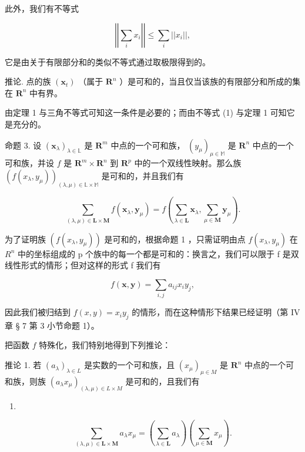 此外，我们有不等式

\[
\left| \left| \sum_ {i} x _ {i} \right| \right| \leqslant \sum_ {i} | | x _ {i} | |,\tag{2}
\]

它是由关于有限部分和的类似不等式通过取极限得到的。

推论. 点的族 \((\pmb{x}_t)\) （属于 \(\mathbf{R}^n\) ）是可和的，当且仅当该族的有限部分和所成的集在 \(\mathbf{R}^n\) 中有界。

由定理 1 与三角不等式可知这一条件是必要的；而由不等式 (1) 与定理 1 可知它是充分的。

命题 3. 设 \((\pmb{x}_{\lambda})_{\lambda \in \mathbb{L}}\) 是 \(\mathbf{R}^m\) 中点的一个可和族， \((y_{\mu})_{\mu \in \mathbb{M}}\) 是 \(\mathbf{R}^n\) 中点的一个可和族，并设 \(f\) 是 \(\mathbf{R}^m \times \mathbf{R}^n\) 到 \(\mathbf{R}^p\) 中的一个双线性映射。那么族 \((f(x_{\lambda}, y_{\mu}))_{(\lambda, \mu) \in \mathbb{L} \times \mathbb{M}}\) 是可和的，并且我们有

\[
\sum_ {(\lambda , \mu) \in \mathbf {L} \times \mathbf {M}} f \left(\boldsymbol {x} _ {\lambda}, \boldsymbol {y} _ {\mu}\right) = f \left(\sum_ {\lambda \in \mathbf {L}} \boldsymbol {x} _ {\lambda}, \sum_ {\mu \in \mathbf {M}} \boldsymbol {y} _ {\mu}\right).\tag{3}
\]

为了证明族 \((f(x_{\lambda}, y_{\mu}))\) 是可和的，根据命题 1 ，只需证明由点 \(f(x_{\lambda}, y_{\mu})\) 在 \(R^{n}\) 中的坐标组成的 p 个族中的每一个都是可和的：换言之，我们可以限于 f 是双线性形式的情形；但对这样的形式 f 我们有

\[
f (\boldsymbol {x}, \boldsymbol {y}) = \sum_ {i, j} a _ {i j} x _ {i} y _ {j},
\]

因此我们被归结到 \(f(x, y) = x_i y_j\) 的情形，而在这种情形下结果已经证明（第 IV 章 § 7 第 3 小节命题 1）。

把函数 \(f\) 特殊化，我们特别地得到下列推论：

推论 1. 若 \((a_{\lambda})_{\lambda \in L}\) 是实数的一个可和族，且 \((x_{\mu})_{\mu \in M}\) 是 \(\mathbf{R}^n\) 中点的一个可和族，则族 \((a_{\lambda}x_{\mu})_{(\lambda, \mu) \in L \times M}\) 是可和的，且我们有

\begin{enumerate}
\def\labelenumi{(\arabic{enumi})}
\setcounter{enumi}{3}
\tightlist
\item
\end{enumerate}

\[
\sum_ {(\lambda , \mu) \in \mathbf {L} \times \mathbf {M}} a _ {\lambda} x _ {\mu} = \left(\sum_ {\lambda \in \mathbf {L}} a _ {\lambda}\right) \left(\sum_ {\mu \in \mathbf {M}} x _ {\mu}\right).
\]

